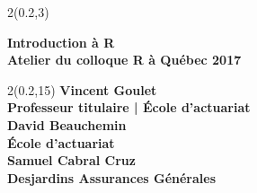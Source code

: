 \begingroup

\textblockorigin{0mm}{0mm}
\begin{frame}[plain]
  \begin{textblock*}{2\TPHorizModule}(0.2\TPHorizModule,3\TPVertModule)
    \raggedright%
    \bfseries
    \fontsize{30}{30}\selectfont
    Introduction à R \\
    \mdseries
    \fontsize{14}{18}\selectfont
    Atelier du colloque R à Québec 2017 \\
  \end{textblock*}

  \begin{textblock*}{2\TPHorizModule}(0.2\TPHorizModule,15\TPVertModule)
    \fontsize{10}{11}\selectfont
    \bfseries
    Vincent Goulet \\
    \fontsize{9}{11}\selectfont
    \mdseries
    Professeur titulaire | École d'actuariat \\[6pt]
    \fontsize{10}{11}\selectfont
    \bfseries
    David Beauchemin \\
    \fontsize{9}{11}\selectfont
    \mdseries
    École d'actuariat \\[6pt]
    \fontsize{10}{11}\selectfont
    \bfseries
    Samuel Cabral Cruz \\
    \fontsize{9}{11}\selectfont
    \mdseries
    Desjardins Assurances Générales
  \end{textblock*}
\end{frame}
\endgroup

